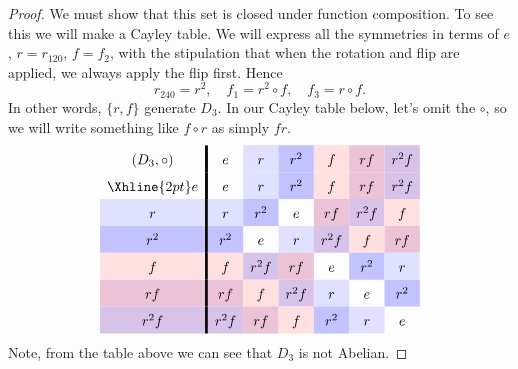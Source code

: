 \documentclass{ximera}
\begin{document}
\begin{example}
\begin{proof}
    We must show that this set is closed under function composition.
    To see this we will make a Cayley table. We will express all the
    symmetries in terms of $e$, $r=r_{120}$, $f=f_2$, with the
    stipulation that when the rotation and flip are applied, we always
    apply the flip first. Hence
    \[
    r_{240} = r^2, \quad  f_1 = r^2\circ f, \quad  f_3 = r\circ f.
    \]
    In other words, $\{r,f\}$ generate $D_3$.  In our Cayley table
    below, let's omit the $\circ$, so we will write something like
    $f\circ r$ as simply $fr$.
    \[
    \renewcommand{\arraystretch}{1.6}
    \begin{array}{c!{\vline width 2pt}cccccc}
      (D_3,\circ)& e     & r\cellcolor{blue!12!white}     & r^2\cellcolor{blue!24!white}   & f \cellcolor{red!12!white}    & r f \cellcolor{blue!33!red!24!white}  & r^2 f\cellcolor{blue!66!red!24!white} \\  \Xhline{2pt}
      e          & e     & r\cellcolor{blue!12!white}    & r^2\cellcolor{blue!24!white}   & f \cellcolor{red!12!white}    & r f \cellcolor{blue!33!red!24!white}   & r^2f \cellcolor{blue!66!red!24!white} \\  
      r\cellcolor{blue!12!white}         & r\cellcolor{blue!12!white}    & r^2\cellcolor{blue!24!white}   & e     & rf\cellcolor{blue!33!red!24!white} & r^2f \cellcolor{blue!66!red!24!white}    & f \cellcolor{red!12!white}   \\  
      r^2\cellcolor{blue!24!white}        & r^2\cellcolor{blue!24!white}   & e     & r\cellcolor{blue!12!white}    & r^2 f \cellcolor{blue!66!red!24!white}   & f \cellcolor{red!12!white} & rf \cellcolor{blue!33!red!24!white}    \\  
      f \cellcolor{red!12!white}         & f \cellcolor{red!12!white}    & r^2f \cellcolor{blue!66!red!24!white}   & r f \cellcolor{blue!33!red!24!white} & e     & r^2\cellcolor{blue!24!white}    & r\cellcolor{blue!12!white}   \\  
      r f \cellcolor{blue!33!red!24!white}        & rf \cellcolor{blue!33!red!24!white}   & f \cellcolor{red!12!white} & r^2f \cellcolor{blue!66!red!24!white}    & r\cellcolor{blue!12!white}   & e     & r^2\cellcolor{blue!24!white}    \\  
      r^2 f\cellcolor{blue!66!red!24!white}      & r^2 f\cellcolor{blue!66!red!24!white} & rf \cellcolor{blue!33!red!24!white}    & f \cellcolor{red!12!white}   & r^2\cellcolor{blue!24!white}    & r\cellcolor{blue!12!white}   & e     \\  
    \end{array}
    \]
    Note, from the table above we can see that $D_3$ is not Abelian.
  \end{proof}
\end{example}
\end{document}
